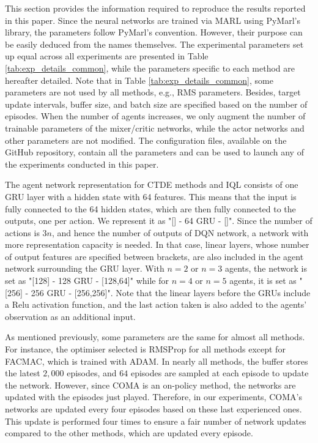 This section provides the information required to reproduce the results reported in this paper.
Since the neural networks are trained via MARL using PyMarl's \citep{samvelyan2019starcraft} library, the parameters follow PyMarl's convention.
However, their purpose can be easily deduced from the names themselves.
The experimental parameters set up equal across all experiments are presented in Table \ref{tab:exp_details_common}, while the parameters specific to each method are hereafter detailed.
Note that in Table \ref{tab:exp_details_common}, some parameters are not used by all methods, e.g., RMS parameters. Besides, target update intervals, buffer size, and batch size are specified based on the number of episodes.
When the number of agents increases, we only augment the number of trainable parameters of the mixer/critic networks, while the actor networks and other parameters are not modified.
The configuration files, available on the GitHub repository, contain all the parameters and can be used to launch any of the experiments conducted in this paper.

The agent network representation for CTDE methods and IQL consists of one GRU layer with a hidden state with 64 features.
This means that the input is fully connected to the 64 hidden states, which are then fully connected to the outputs, one per action.
We represent it as "[] - 64 GRU - []".
Since the number of actions is $3n$, and hence the number of outputs of DQN network, a network with more representation capacity is needed.
In that case, linear layers, whose number of output features are specified between brackets, are also included in the agent network surrounding the GRU layer.
With $n=2$ or $n=3$ agents, the network is set as "[128] - 128 GRU - [128,64]" while for $n=4$ or $n=5$ agents, it is set as "[256] - 256 GRU - [256,256]".
Note that the linear layers before the GRUs include a Relu activation function, and the last action taken is also added to the agents' observation as an additional input.

As mentioned previously, some parameters are the same for almost all methods.
For instance, the optimiser selected is RMSProp for all methods except for FACMAC, which is trained with ADAM.
In nearly all methods, the buffer stores the latest $2,000$ episodes, and $64$ episodes are sampled at each episode to update the network.
However, since COMA is an on-policy method, the networks are updated with the episodes just played.
Therefore, in our experiments, COMA's networks are updated every four episodes based on these last experienced ones.
This update is performed four times to ensure a fair number of network updates compared to the other methods, which are updated every episode.

